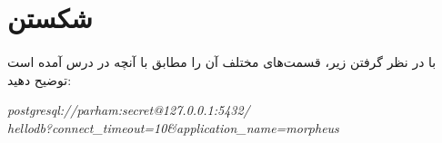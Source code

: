 \documentclass[../main.tex]{subfiles}
\begin{document}
\section{شکستن }

\paragraph{}
با در نظر گرفتن  زیر، قسمت‌های مختلف آن را مطابق با آنچه در درس آمده است توضیح دهید:

\begin{latin}
  \textit{postgresql://parham:secret@127.0.0.1:5432/}\\
  \textit{hellodb?connect\_timeout=10\&application\_name=morpheus}
\end{latin}
\end{document}

